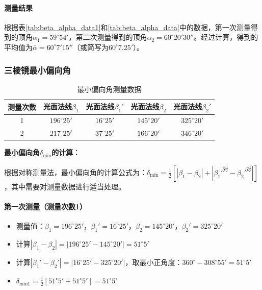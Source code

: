 \documentclass[11pt]{article}
\begin{document}
\paragraph{测量结果}

根据表\ref{tab:beta_alpha_data1}和\ref{tab:beta_alpha_data}中的数据，第一次测量得到的顶角$\alpha_1 = 59^\circ54'$，第二次测量得到的顶角$\alpha_2 = 60^\circ20'30''$。经过计算，得到的平均值为$\bar{\alpha} = 60^\circ7'15''$（或简写为$60^\circ7.25'$）。

\subsubsection{三棱镜最小偏向角}
\begin{table}[htbp]
  \centering
  \caption{最小偏向角测量数据}
  \vspace{0.5em}
  \begin{tabular}{c c c c c}
    \toprule
    测量次数 & 光面法线$\beta_1$ & 光面法线$\beta_1'$ & 光面法线$\beta_2$ & 光面法线$\beta_2'$ \\
    \midrule
    1 & $196^\circ25'$ & $16^\circ25'$ & $145^\circ20'$ & $325^\circ20'$ \\
    2 & $217^\circ25'$ & $37^\circ25'$ & $166^\circ20'$ & $346^\circ20'$ \\
    \bottomrule
  \end{tabular}
\end{table}


\textbf{最小偏向角\(\delta_{\text{min}}\)的计算}：

根据对称测量法，最小偏向角的计算公式为：\(\delta_{\text{min}} = \frac{1}{2}\left[|\beta_1 - \beta_2| + |{\beta_1'}^{\text{对}} - {\beta_2'}^{\text{对}}|\right]\)，其中需要对测量数据进行适当处理。

\paragraph{第一次测量（测量次数1）}

\begin{itemize}[itemsep=0.3ex]
\item 测量值：\(\beta_1 = 196^\circ25'\)，\(\beta_1' = 16^\circ25'\)，\(\beta_2 = 145^\circ20'\)，\(\beta_2' = 325^\circ20'\)
\item 计算\(|\beta_1 - \beta_2| = |196^\circ25' - 145^\circ20'| = 51^\circ5'\)
\item 计算\(|\beta_1' - \beta_2'| = |16^\circ25' - 325^\circ20'|\)，取最小正角度：\(360^\circ - 308^\circ55' = 51^\circ5'\)
\item \(\delta_{\text{min1}} = \frac{1}{2}\left[51^\circ5' + 51^\circ5'\right] = 51^\circ5'\)
\end{itemize}
\end{document}
